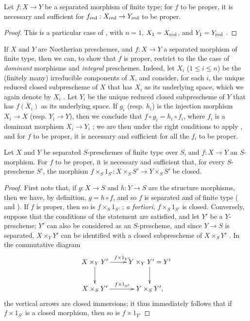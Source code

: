 \begin{corollary}[5.4.6]
\label{II.5.4.6}
Let $f:X\to Y$ be a separated morphism of finite type; for $f$ to be proper, it is necessary and sufficient for $f_\red:X_\red\to Y_\red$ to be proper.
\end{corollary}

\begin{proof}
This is a particular case of , with $n=1$, $X_1=X_{\mathrm{red}}$, and $Y_1=Y_{\mathrm{red}}$ .
\end{proof}

\begin{env}[5.4.7]
\label{II.5.4.7}
If $X$ and $Y$ are Noetherian preschemes, and $f:X\to Y$ a separated morphism of finite type, then we can, to show that $f$ is proper, restrict to the the case of \emph{dominant} morphisms and \emph{integral} preschemes.
Indeed, let $X_i$ ($1\leq i\leq n$) be the (finitely many) irreducible components of $X$, and consider, for each $i$, the unique reduced closed subprescheme of $X$ that has $X_i$ as its underlying space, which we again denote by $X_i$ .
Let $Y_i$ be the unique reduced closed subprescheme of $Y$ that has $\overline{f(X_i)}$ as its underlying space.
If $g_i$ (resp. $h_i$) is the injection morphism $X_i\to X$ (resp. $Y_i\to Y$), then we conclude that $f\circ g_i=h_i\circ f_i$, where $f_i$ is a dominant morphism $X_i\to Y_i$ ;
we are then under the right conditions to apply , and for $f$ to be proper, it is necessary and sufficient for all the $f_i$ to be proper.
\end{env}

\begin{corollary}[5.4.8]
\label{II.5.4.8}
Let $X$ and $Y$ be separated $S$-preschemes of finite type over $S$, and $f:X\to Y$ an $S$-morphism.
For $f$ to be proper, it is necessary and sufficient that, for every $S$-prescheme $S'$, the morphism $f\times_S 1_{S'}:X\times_S S'\to Y\times_S S'$ be closed.
\end{corollary}

\begin{proof}
First note that, if $g:X\to S$ and $h:Y\to S$ are the structure morphisms, then we have, by definition, $g=h\circ f$, and so $f$ is separated and of finite type ( and ).
If $f$ is proper, then so is $f\times_S 1_{S'}$ ; \emph{a fortiori}, $f\times_S 1_{S'}$ is closed.
Conversely, suppose that the conditions of the statement are satisfied, and let $Y'$ be a $Y$-prescheme;
$Y'$ can also be considered as an $S$-prescheme, and since $Y\to S$ is separated, $X\times_Y Y'$ can be identified with a closed subprescheme of $X\times_S Y'$ .
In the commutative diagram
\[
  \xymatrix{
    X\times_Y Y'\ar[r]^{f\times1_{Y'}}\ar[d] &
    Y\times_Y Y'=Y'\ar[d]\\
    X\times_S Y'\ar[r]^{f\times1_{S'}} &
    Y\times_S Y',
  }
\]
the vertical arrows are closed immersions; it thus immediately follows that if $f\times1_{S'}$ is a closed morphism, then so is $f\times1_{Y'}$
\end{proof}

